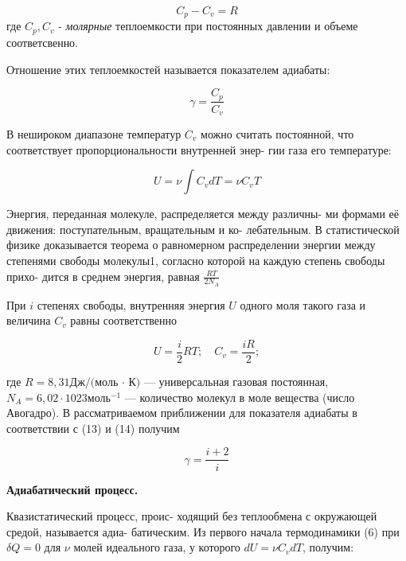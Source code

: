 \documentclass[12pt]{article}
\begin{document}
    \begin{equation}
        C_p - C_v = R
    \end{equation}
    где $C_p, C_v$ - \textit{молярные} теплоемкости при постоянных давлении и объеме соответсвенно.

    Отношение этих теплоемкостей называется показателем адиабаты:

    \begin{equation}
        \gamma = \frac{C_p}{C_v}
    \end{equation}

    В нешироком диапазоне температур $C_v$ можно считать постоянной, что соответствует пропорциональности внутренней энер- гии газа его температуре:

    \begin{equation}
        U = \nu \int C_v dT = \nu C_v T
    \end{equation}

    Энергия, переданная молекуле, распределяется между различны- ми формами её движения: поступательным, вращательным и ко- лебательным. В статистической физике доказывается теорема о равномерном распределении энергии между степенями свободы молекулы1, согласно которой на каждую степень свободы прихо- дится в среднем энергия, равная $\frac{RT}{2 N_A}$

    При $i$ степенях свободы, внутренняя энергия $U$ одного моля такого газа и величина $C_v$ равны соответственно

    \begin{equation}
        U = \frac{i}{2}RT; \quad C_v = \frac{iR}{2}; 
    \end{equation}

    где $R = 8,31 \text{Дж}/\text{(моль · К)}$ — универсальная газовая постоянная, $N_A = 6,02 · 1023 \text{моль}^{−1}$ — количество молекул в моле вещества (число Авогадро).
    В рассматриваемом приближении для показателя адиабаты в соответствии с (13) и (14) получим

    \begin{equation}
        \gamma = \frac{i+2}{i}
    \end{equation}

    \textbf{Адиабатический процесс.}

    Квазистатический процесс, проис- ходящий без теплообмена с окружающей средой, называется адиа- батическим.
    Из первого начала термодинамики (6) при $\delta Q = 0$ для $\nu$ молей идеального газа, у которого $dU = \nu C_v dT$, получим:
\end{document}

